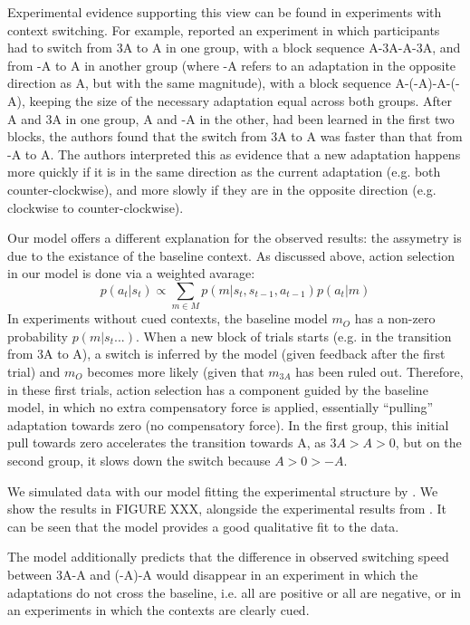 \documentclass[a4paper,doc,floatsintext,natbib]{apa6}
\begin{document}
Experimental evidence supporting this view can be found in experiments with context switching. For example, \cite{Davidson_Scaling_2004} reported an experiment in which participants had to switch from 3A to A in one group, with a block sequence A-3A-A-3A, and from -A to A in another group (where -A refers to an adaptation in the opposite direction as A, but with the same magnitude), with a block sequence A-(-A)-A-(-A), keeping the size of the necessary adaptation equal across both groups. After A and 3A in one group, A and -A in the other, had been learned in the first two blocks, the authors found that the switch from 3A to A was faster than that from -A to A. The authors interpreted this as evidence that a new adaptation happens more quickly if it is in the same direction as the current adaptation (e.g. both counter-clockwise), and more slowly if they are in the opposite direction (e.g. clockwise to counter-clockwise).

Our model offers a different explanation for the observed results: the assymetry is due to the existance of the baseline context. As discussed above, action selection in our model is done via a weighted avarage:
\begin{equation}
p(a_t | s_t) \propto \displaystyle \sum_{m \in M} p(m | s_t, s_{t-1}, a_{t-1}) p(a_t | m)
\end{equation}
In experiments without cued contexts, the baseline model $m_O$ has a non-zero probability $p(m | s_t ...)$. When a new block of trials starts (e.g. in the transition from 3A to A), a switch is inferred by the model (given feedback after the first trial) and $m_O$ becomes more likely (given that $m_{3A}$ has been ruled out. Therefore, in these first trials, action selection has a component guided by the baseline model, in which no extra compensatory force is applied, essentially ``pulling'' adaptation towards zero (no compensatory force). In the first group, this initial pull towards zero accelerates the transition towards A, as $3A > A > 0$, but on the second group, it slows down the switch because $A > 0 > -A$.

We simulated data with our model fitting the experimental structure by \cite{Davidson_Scaling_2004}. We show the results in FIGURE XXX, alongside the experimental results from \cite{Davidson_Scaling_2004}. It can be seen that the model provides a good qualitative fit to the data.

The model additionally predicts that the difference in observed switching speed between 3A-A and (-A)-A would disappear in an experiment in which the adaptations do not cross the baseline, i.e. all are positive or all are negative, or in an experiments in which the contexts are clearly cued.
\end{document}
